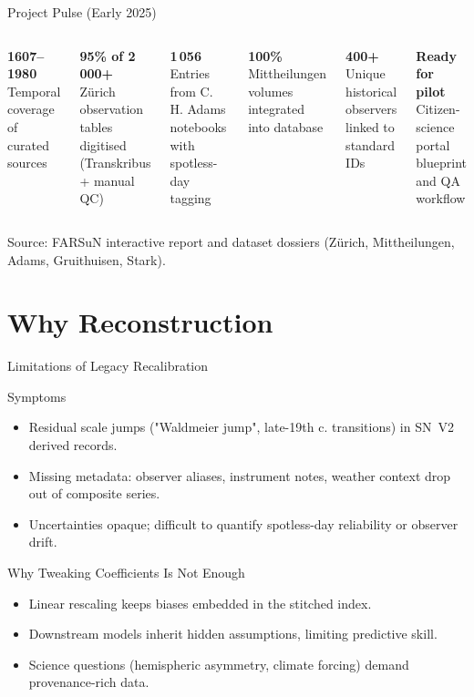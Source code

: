 \documentclass[aspectratio=169]{beamer}
\newcommand{\metric}[3][]{%
  \begin{minipage}[t]{#2}\raggedright
    {\Large\bfseries\textcolor{accent}{#3}}\\[-0.2em]
    {\scriptsize #1}
  \end{minipage}}
\begin{document}
\begin{frame}[t]{Project Pulse (Early 2025)}
\vspace{-0.2em}
\begin{columns}[T,onlytextwidth]
\metric[Temporal coverage of curated sources]{\linewidth}{1607--1980}
\par\vspace{0.8em}
\metric[Zürich observation tables digitised (Transkribus + manual QC)]{\linewidth}{95\% of 2\,000+}

\metric[Entries from C. H. Adams notebooks with spotless-day tagging]{\linewidth}{1\,056}
\par\vspace{0.8em}
\metric[Mittheilungen volumes integrated into database]{\linewidth}{100\%}

\metric[Unique historical observers linked to standard IDs]{\linewidth}{400+}
\par\vspace{0.8em}
\metric[Citizen-science portal blueprint and QA workflow]{\linewidth}{Ready for pilot}
\end{columns}

\vspace{0.6em}
\scriptsize Source: FARSuN interactive report and dataset dossiers (Zürich, Mittheilungen, Adams, Gruithuisen, Stark).
\end{frame}

\section[Motivation]{Why Reconstruction}

\begin{frame}[t]{Limitations of Legacy Recalibration}
\begin{block}{Symptoms}
\begin{itemize}
  \item Residual scale jumps ("Waldmeier jump", late-19th c. transitions) in SN~V2 derived records.
  \item Missing metadata: observer aliases, instrument notes, weather context drop out of composite series.
  \item Uncertainties opaque; difficult to quantify spotless-day reliability or observer drift.
\end{itemize}
\end{block}

\begin{block}{Why Tweaking Coefficients Is Not Enough}
\begin{itemize}
  \item Linear rescaling keeps biases embedded in the stitched index.
  \item Downstream models inherit hidden assumptions, limiting predictive skill.
  \item Science questions (hemispheric asymmetry, climate forcing) demand provenance-rich data.
\end{itemize}
\end{block}
\end{frame}
\end{document}
